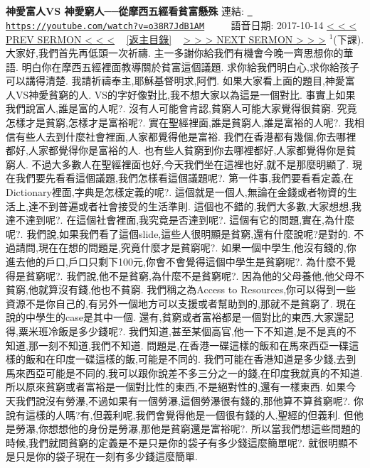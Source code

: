 \documentclass{book}
\begin{document}
\section{}
\label{sec:o38R7JdB1AM}
\textbf{神愛富人VS 神愛窮人──從摩西五經看貧富懸殊}
\newline
\newline
連結: \href{https://youtube.com/watch?v=o38R7JdB1AM}{\texttt{ https://youtube.com/watch?v=o38R7JdB1AM}} ~~~~ 語音日期: 2017-10-14 
\newline
\newline
\hyperref[sec:O6ul_iQf2j0]{\small{< < < PREV SERMON < < <}}
~
\hyperref[sec:index]{\small{[返主目錄]}}
~
\hyperref[sec:ATvaAgvlFj8]{\small{> > > NEXT SERMON > > >}}
\newline
\newline
$^{1}$(下課).
大家好,我們首先再低頭一次祈禱.
主一多謝你給我們有機會今晚一齊思想你的華語.
明白你在摩西五經裡面教導關於貧富這個議題.
求你給我們明白心,求你給孩子可以講得清楚.
我請祈禱奉主,耶穌基督明求,阿們.
如果大家看上面的題目,神愛富人VS神愛貧窮的人.
VS的字好像對比,我不想大家以為這是一個對比.
事實上如果我們說富人,誰是富的人呢?.
沒有人可能會肯認,貧窮人可能大家覺得很貧窮.
究竟怎樣才是貧窮,怎樣才是富裕呢?.
實在聖經裡面,誰是貧窮人,誰是富裕的人呢?.
我相信有些人去到什麼社會裡面,人家都覺得他是富裕.
我們在香港都有幾個,你去哪裡都好,人家都覺得你是富裕的人.
也有些人貧窮到你去哪裡都好,人家都覺得你是貧窮人.
不過大多數人在聖經裡面也好,今天我們坐在這裡也好,就不是那麼明顯了.
現在我們要先看看這個議題,我們怎樣看這個議題呢?.
第一件事,我們要看看定義,在Dictionary裡面,字典是怎樣定義的呢?.
這個就是一個人,無論在金錢或者物資的生活上,達不到普遍或者社會接受的生活準則.
這個也不錯的,我們大多數,大家想想,我達不達到呢?.
在這個社會裡面,我究竟是否達到呢?.
這個有它的問題,實在,為什麼呢?.
我們說,如果我們看了這個slide,這些人很明顯是貧窮,還有什麼說呢?是對的.
不過請問,現在在想的問題是,究竟什麼才是貧窮呢?.
如果一個中學生,他沒有錢的,你進去他的戶口,戶口只剩下100元,你會不會覺得這個中學生是貧窮呢?.
為什麼不覺得是貧窮呢?.
我們說,他不是貧窮,為什麼不是貧窮呢?.
因為他的父母養他,他父母不貧窮,他就算沒有錢,他也不貧窮.
我們稱之為Access to Resources,你可以得到一些資源不是你自己的,有另外一個地方可以支援或者幫助到的,那就不是貧窮了.
現在說的中學生的case是其中一個.
還有,貧窮或者富裕都是一個對比的東西,大家還記得,粟米班冷飯是多少錢呢?.
我們知道,甚至某個高官,他一下不知道,是不是真的不知道,那一刻不知道,我們不知道.
問題是,在香港一碟這樣的飯和在馬來西亞一碟這樣的飯和在印度一碟這樣的飯,可能是不同的.
我們可能在香港知道是多少錢,去到馬來西亞可能是不同的,我可以跟你說差不多三分之一的錢,在印度我就真的不知道.
所以原來貧窮或者富裕是一個對比性的東西,不是絕對性的,還有一樣東西.
如果今天我們說沒有勞瀑,不過如果有一個勞瀑,這個勞瀑很有錢的,那他算不算貧窮呢?.
你說有這樣的人嗎?有,但義利呢,我們會覺得他是一個很有錢的人,聖經的但義利.
但他是勞瀑,你想想他的身份是勞瀑,那他是貧窮還是富裕呢?.
所以當我們想這些問題的時候,我們就問貧窮的定義是不是只是你的袋子有多少錢這麼簡單呢?.
就很明顯不是只是你的袋子現在一刻有多少錢這麼簡單.
\end{document}
